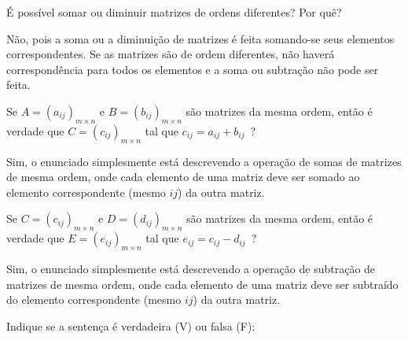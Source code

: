 \documentclass[pdftex, brazil, 12pt, oneside, addpoints, answers]{exam}
\newcommand{\vf}[1][{}]{%
  \fillin[#1][0.25in]%
}
\begin{document}
\begin{questions}
\question
É possível somar ou diminuir matrizes de ordens diferentes? Por quê?
\begin{solutionorlines}[0.50in]
  Não, pois a soma ou a diminuição de matrizes é feita somando-se seus
  elementos correspondentes. Se as matrizes são de ordem diferentes, não
  haverá correspondência para todos os elementos e a soma ou subtração
  não pode ser feita.
\end{solutionorlines}

\question
Se $A = (a_{ij})_{m \times n}$ e $B = (b_{ij})_{m \times n}$ são matrizes
da mesma ordem, então é verdade que $C = (c_{ij})_{m \times n}$ tal que
$c_{ij} = a_{ij} + b_{ij}$\ ?
\begin{solutionorlines}[0.50in]
  Sim, o enunciado simplesmente está descrevendo a operação de somas de matrizes
  de mesma ordem, onde cada elemento de uma matriz deve ser somado ao elemento
  correspondente (mesmo $ij$) da outra matriz.
\end{solutionorlines}

\question
Se $C = (c_{ij})_{m \times n}$ e $D = (d_{ij})_{m \times n}$ são matrizes
da mesma ordem, então é verdade que $E = (e_{ij})_{m \times n}$ tal que
$e_{ij} = c_{ij} - d_{ij}$\ ?
\begin{solutionorlines}[0.50in]
  Sim, o enunciado simplesmente está descrevendo a operação de subtração de matrizes
  de mesma ordem, onde cada elemento de uma matriz deve ser subtraído do elemento
  correspondente (mesmo $ij$) da outra matriz.
\end{solutionorlines}

\question
Indique se a sentença é verdadeira (V) ou falsa (F):
\end{questions}
\end{document}
